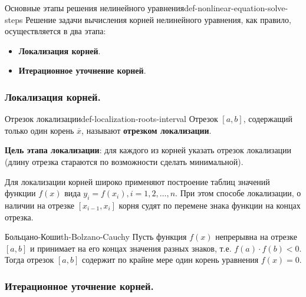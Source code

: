 \documentclass[14pt]{extarticle}
\begin{document}
    \begin{definition}{Основные этапы решения нелинейного уравнения}{def-nonlinear-equation-solve-steps}
        Решение задачи вычисления корней нелинейного уравнения, как правило, осуществляется в два этапа:
        \begin{itemize}
            \item \textbf{Локализация корней}.
            \item \textbf{Итерационное уточнение корней}.
        \end{itemize}
    \end{definition}

    \subsubsection{Локализация корней.}

        \begin{definition}{Отрезок локализации}{def-localization-roots-interval}
            Отрезок $[a, b]$, содержащий только один корень $\overline{x}$, называют \textbf{отрезком локализации}. 
        \end{definition}

        \textbf{Цель этапа локализации}: для каждого из корней указать отрезок локализации (длину отрезка стараются по возможности сделать минимальной).
        
        \vspace{\baselineskip}
        
        Для локализации корней широко применяют построение таблиц значений функции $f(x)$ вида $y_{i} = f(x_{i}), i = 1, 2, \ldots, n$. При этом способе локализации, о наличии на отрезке $[x_{i-1}, x_{i}]$ корня судят по перемене знака функции на концах отрезка.

        \begin{theorem}{Больцано-Коши}{th-Bolzano-Cauchy}
            Пусть функция $f(x)$ непрерывна на отрезке $[a, b]$ и принимает на его концах значения разных знаков, т.е. $f(a) \cdot f(b) < 0$.\\ 
            Тогда отрезок $[a, b]$ содержит по крайне мере один корень уравнения $f(x) = 0$.
        \end{theorem}

    \clearpage
    \subsubsection{Итерационное уточнение корней.}
        
\end{document}
